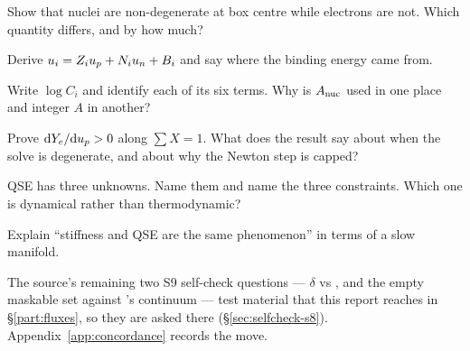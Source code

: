 \begin{selfcheck}
\item Show that nuclei are non-degenerate at box centre while electrons are not.
  Which quantity differs, and by how much?
\item Derive $u_i = Z_i u_{p} + N_i u_{n} + B_i$ and say where the binding energy
  came from.
\item Write $\log C_i$ and identify each of its six terms. Why is $A_{\rm nuc}$
  used in one place and integer $A$ in another?
\item Prove $\mathrm{d}Y_{e}/\mathrm{d}u_{p} > 0$ along $\sum X = 1$. What does the result say
  about when the solve is degenerate, and about why the Newton step is capped?
\item QSE has three unknowns. Name them and name the three constraints. Which
  one is dynamical rather than thermodynamic?
\item Explain ``stiffness and QSE are the same phenomenon'' in terms of a slow
  manifold.
\end{selfcheck}

\begin{aside}
The source's remaining two S9 self-check questions --- $\delta$ vs \rQSE{}, and
the empty maskable set against \kap's continuum --- test material that this
report reaches in \S\ref{part:fluxes}, so they are asked there
(\S\ref{sec:selfcheck-s8}). Appendix~\ref{app:concordance} records the move.
\end{aside}
